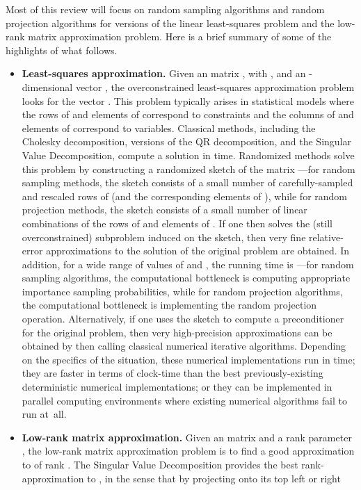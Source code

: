 \documentclass[twoside]{article}
\begin{document}
Most of this review will focus on random sampling algorithms and random 
projection algorithms for versions of the linear least-squares problem and 
the low-rank matrix approximation problem.
Here is a brief summary of some of the highlights of what follows.
\begin{itemize}
\item
\textbf{Least-squares approximation.}
Given an  matrix , with , and an -dimensional 
vector , the overconstrained least-squares approximation problem looks 
for the vector .
This problem typically arises in statistical models where the rows of  
and elements of  correspond to constraints and the columns of  and 
elements of  correspond to variables.
Classical methods, including the Cholesky decomposition, versions of the QR 
decomposition, and the Singular Value Decomposition, compute a solution
in  time.
Randomized methods solve this problem by constructing a randomized sketch 
of the matrix ---for random sampling methods, the sketch consists of a 
small number of carefully-sampled and rescaled rows of  (and the 
corresponding elements of ), while for random projection methods, the 
sketch consists of a small number of linear combinations of the rows of  and elements of .
If one then solves the (still overconstrained) subproblem induced on the 
sketch, then very fine relative-error approximations to the solution of the 
original problem are obtained.
In addition, for a wide range of values of  and , the running time is 
---for random sampling algorithms, the computational bottleneck is 
computing appropriate importance sampling probabilities, while for random 
projection algorithms, the computational bottleneck is implementing the 
random projection operation.
Alternatively, if one uses the sketch to compute a preconditioner for the
original problem, then very high-precision approximations can be obtained by
then calling classical numerical iterative algorithms.
Depending on the specifics of the situation, these numerical implementations 
run in  time; they are faster in terms of clock-time than the best 
previously-existing deterministic numerical implementations; or they can be implemented in 
parallel computing environments where existing numerical algorithms fail to 
run at~all.
\item
\textbf{Low-rank matrix approximation.}
Given an  matrix  and a rank parameter , the low-rank 
matrix approximation problem is to find a good approximation to  of 
rank .
The Singular Value Decomposition provides the best rank- approximation 
to , in the sense that by projecting  onto its top  left or right 

\end{itemize}
\end{document}
